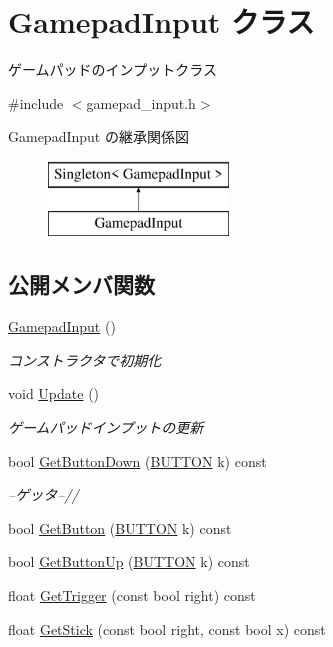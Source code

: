 \hypertarget{class_gamepad_input}{}\section{Gamepad\+Input クラス}
\label{class_gamepad_input}


ゲームパッドのインプットクラス  




{\ttfamily \#include $<$gamepad\+\_\+input.\+h$>$}

Gamepad\+Input の継承関係図\begin{figure}[H]
\begin{center}
\leavevmode
\includegraphics[height=2.000000cm]{class_gamepad_input}
\end{center}
\end{figure}
\subsection*{公開メンバ関数}
\begin{DoxyCompactItemize}
\item 
\mbox{\hyperlink{class_gamepad_input_acd9878326e438f379020827d63ebd6cf}{Gamepad\+Input}} ()
\begin{DoxyCompactList}\small\item\em コンストラクタで初期化 \end{DoxyCompactList}\item 
void \mbox{\hyperlink{class_gamepad_input_a3512c0cc4d57534c83db09c4b5377caa}{Update}} ()
\begin{DoxyCompactList}\small\item\em ゲームパッドインプットの更新 \end{DoxyCompactList}\item 
bool \mbox{\hyperlink{class_gamepad_input_a7e7a0e3d48ce3f91332fd52c4c92bb8f}{Get\+Button\+Down}} (\mbox{\hyperlink{gamepad__input_8h_a739845b0076428add52ca3cec492e705}{B\+U\+T\+T\+ON}} k) const
\begin{DoxyCompactList}\small\item\em --ゲッタ--// \end{DoxyCompactList}\item 
bool \mbox{\hyperlink{class_gamepad_input_a2bf3c765fd5e4261a0ab56c8871bd614}{Get\+Button}} (\mbox{\hyperlink{gamepad__input_8h_a739845b0076428add52ca3cec492e705}{B\+U\+T\+T\+ON}} k) const
\item 
bool \mbox{\hyperlink{class_gamepad_input_a2c013028c4e0983a957666ff9922a40c}{Get\+Button\+Up}} (\mbox{\hyperlink{gamepad__input_8h_a739845b0076428add52ca3cec492e705}{B\+U\+T\+T\+ON}} k) const
\item 
float \mbox{\hyperlink{class_gamepad_input_aab528f55fe651996096e697acdec4546}{Get\+Trigger}} (const bool right) const
\item 
float \mbox{\hyperlink{class_gamepad_input_ab7e3fb80f81fcafdfc7c0f546c280929}{Get\+Stick}} (const bool right, const bool x) const
\end{DoxyCompactItemize}
